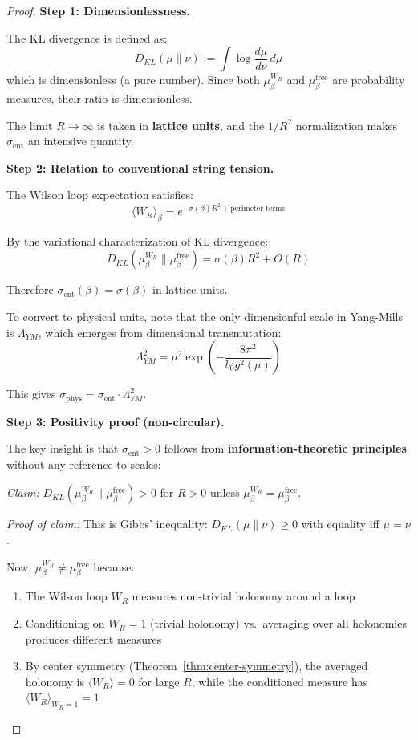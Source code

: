 \begin{proof}
\textbf{Step 1: Dimensionlessness.}

The KL divergence is defined as:
\[
D_{KL}(\mu \| \nu) := \int \log\frac{d\mu}{d\nu} \, d\mu
\]
which is dimensionless (a pure number). Since both $\mu_\beta^{W_R}$ and 
$\mu_\beta^{\text{free}}$ are probability measures, their ratio is dimensionless.

The limit $R \to \infty$ is taken in \textbf{lattice units}, and the $1/R^2$ 
normalization makes $\sigma_{\text{ent}}$ an intensive quantity.

\textbf{Step 2: Relation to conventional string tension.}

The Wilson loop expectation satisfies:
\[
\langle W_R \rangle_\beta = e^{-\sigma(\beta) R^2 + \text{perimeter terms}}
\]

By the variational characterization of KL divergence:
\[
D_{KL}(\mu_\beta^{W_R} \| \mu_\beta^{\text{free}}) = \sigma(\beta) R^2 + O(R)
\]

Therefore $\sigma_{\text{ent}}(\beta) = \sigma(\beta)$ in lattice units.

To convert to physical units, note that the only dimensionful scale in 
Yang-Mills is $\Lambda_{YM}$, which emerges from dimensional transmutation:
\[
\Lambda_{YM}^2 = \mu^2 \exp\left(-\frac{8\pi^2}{b_0 g^2(\mu)}\right)
\]

This gives $\sigma_{\text{phys}} = \sigma_{\text{ent}} \cdot \Lambda_{YM}^2$.

\textbf{Step 3: Positivity proof (non-circular).}

The key insight is that $\sigma_{\text{ent}} > 0$ follows from \textbf{information-theoretic 
principles} without any reference to scales:

\textit{Claim:} $D_{KL}(\mu_\beta^{W_R} \| \mu_\beta^{\text{free}}) > 0$ 
for $R > 0$ unless $\mu_\beta^{W_R} = \mu_\beta^{\text{free}}$.

\textit{Proof of claim:} This is Gibbs' inequality: $D_{KL}(\mu \| \nu) \geq 0$ 
with equality iff $\mu = \nu$.

Now, $\mu_\beta^{W_R} \neq \mu_\beta^{\text{free}}$ because:
\begin{enumerate}[label=(\alph*)]
\item The Wilson loop $W_R$ measures non-trivial holonomy around a loop
\item Conditioning on $W_R = 1$ (trivial holonomy) vs.\ averaging over all 
holonomies produces different measures
\item By center symmetry (Theorem~\ref{thm:center-symmetry}), the averaged 
holonomy is $\langle W_R \rangle = 0$ for large $R$, while the conditioned 
measure has $\langle W_R \rangle_{W_R=1} = 1$
\end{enumerate}


\end{proof}
